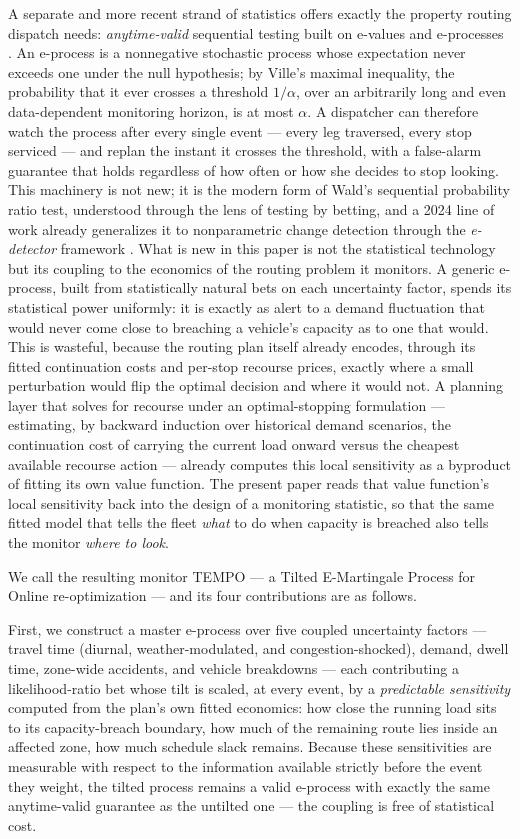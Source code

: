 \documentclass[trsc,dblanonrev]{informs4}
\begin{document}
A separate and more recent strand of statistics offers exactly the
property routing dispatch needs: \emph{anytime-valid} sequential
testing built on e-values and e-processes
\citep{shafer2021testing,ramdas2023safi}. An e-process is a
nonnegative stochastic process whose expectation never exceeds one
under the null hypothesis; by Ville's maximal inequality, the
probability that it ever crosses a threshold $1/\alpha$, over an
arbitrarily long and even data-dependent monitoring horizon, is at
most $\alpha$. A dispatcher can therefore watch the process after every
single event --- every leg traversed, every stop serviced --- and
replan the instant it crosses the threshold, with a false-alarm
guarantee that holds regardless of how often or how she decides to
stop looking. This machinery is not new; it is the modern form of
Wald's sequential probability ratio test, understood through the lens
of testing by betting, and a 2024 line of work already generalizes it
to nonparametric change detection through the \emph{e-detector}
framework \citep{shin2024edetectors}. What is new in this paper is not
the statistical technology but its coupling to the economics of the
routing problem it monitors. A generic e-process, built from
statistically natural bets on each uncertainty factor, spends its
statistical power uniformly: it is exactly as alert to a demand
fluctuation that would never come close to breaching a vehicle's
capacity as to one that would. This is wasteful, because the routing
plan itself already encodes, through its fitted continuation costs and
per-stop recourse prices, exactly where a small perturbation would
flip the optimal decision and where it would not. A planning layer
that solves for recourse under an optimal-stopping formulation ---
estimating, by backward induction over historical demand scenarios,
the continuation cost of carrying the current load onward versus the
cheapest available recourse action --- already computes this local
sensitivity as a byproduct of fitting its own value function. The
present paper reads that value function's local sensitivity back into
the design of a monitoring statistic, so that the same fitted model
that tells the fleet \emph{what} to do when capacity is breached also
tells the monitor \emph{where to look}.

We call the resulting monitor TEMPO --- a Tilted E-Martingale Process
for Online re-optimization --- and its four contributions are as
follows.

First, we construct a master e-process over five coupled uncertainty
factors --- travel time (diurnal, weather-modulated, and
congestion-shocked), demand, dwell time, zone-wide accidents, and
vehicle breakdowns --- each contributing a likelihood-ratio bet whose
tilt is scaled, at every event, by a \emph{predictable sensitivity}
computed from the plan's own fitted economics: how close the running
load sits to its capacity-breach boundary, how much of the remaining
route lies inside an affected zone, how much schedule slack remains.
Because these sensitivities are measurable with respect to the
information available strictly before the event they weight, the
tilted process remains a valid e-process with exactly the same
anytime-valid guarantee as the untilted one --- the coupling is free of
statistical cost.
\end{document}
